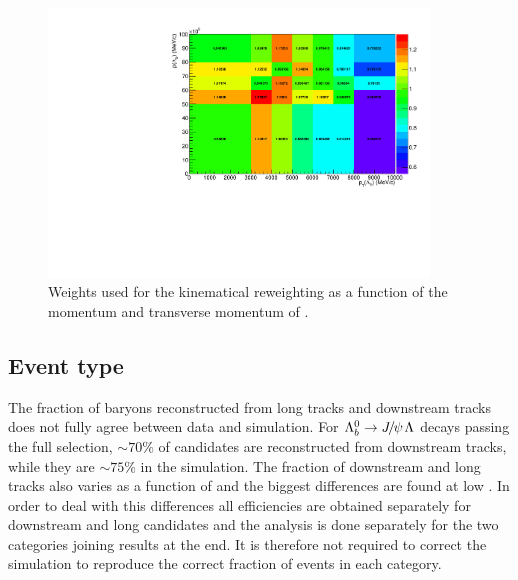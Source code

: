 \begin{figure}
\centering
\includegraphics[width=0.9\textwidth]{Lmumu/figs/ratio_Lb_p_pt.pdf}
 \caption{Weights used for the kinematical reweighting as a function of the momentum and transverse momentum of \Lb. }
\label{fig:kinWeight}
\end{figure}

\subsection{Event type}

The fraction of \Lz baryons reconstructed from long tracks and downstream tracks does not fully agree between data and simulation.
For $\Lb\to\jpsi\Lz$ decays passing the full selection, $\sim 70\%$ of candidates are reconstructed from downstream tracks, while
they are $\sim 75\%$ in the simulation.
The fraction of downstream and long tracks also varies as a function of \qsq and the biggest differences are found at low \qsq.
In order to deal with this differences all efficiencies are obtained separately for downstream and long candidates and the analysis is done 
separately for the two categories joining results at the end. It is therefore not required to correct the simulation
to reproduce the correct fraction of events in each category.

